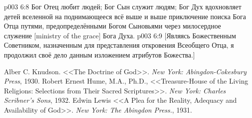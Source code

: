 \vs p003 6:8 \pc Бог Отец любит людей; Бог Сын служит людям; Бог Дух вдохновляет детей вселенной на поднимающееся всё выше и выше приключение поиска Бога Отца путями, предопределёнными Богом Сыновьями через милосердное служение [ministry of the grace] Бога Духа.
\vsetoff
\vs p003 6:9 [Являясь Божественным Советником, назначенным для представления откровения Всеобщего Отца, я продолжил своё дело данным изложением атрибутов Божества.]
\quizlink
\begin{thebibliography}{100}
Alber C. Knudson.
{<<The Doctrine of God>>.}
{\em New York: Abingdon-Cokesbury Press}, 1930.
Robert Ernest Hume, M.A., Ph.D.,
{<<Treasure\hyp{}House of the Living Religions: Selections from Their Sacred Scriptures>>.}
{\em New York: Charles Scribner's Sons}, 1932.
Edwin Lewis
{<<A Plea for the Reality, Adequacy and Availability of God>>.}
{\em New York: The Abingdon Press.}, 1931.
\end{thebibliography}
